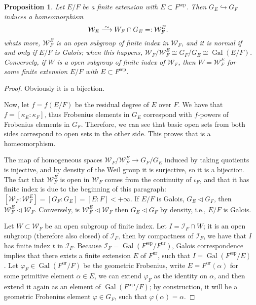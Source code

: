 \documentclass[12pt]{article}
\theoremstyle{plain}
\newtheorem{proposition}[theorem]{Proposition}
\theoremstyle{definition}
\newcommand{\isomlongrightarrow}{\mathrel{\stackon[1pt]{$\longrightarrow$}{\resizebox{!}{3pt}{$\sim$}}}}
\newcommand{\Gal}[2]{\operatorname{Gal} ( #1 / #2 )}
\newcommand{\sep}[1]{{#1}^{\operatorname{sep}}}
\newcommand{\ur}[1]{{#1}^{\operatorname{ur}}}
\newcommand{\inercia}[1]{\mathcal I_{#1}}
\newcommand{\weil}[1]{\mathcal W_{#1}}
\begin{document}
\begin{proposition}
Let $E/F$ be a finite extension with $E \subset \sep F$. Then $G_E \hookrightarrow G_F$ induces a homeomorphism
\[
    \weil E \isomlongrightarrow W_F \cap G_E =: \weil F^E.
\]
whats more, $\weil F^E$ is an open subgroup of finite index in $\weil F$, and it is normal if and only if $E/F$ is Galois; when this happens, $\weil F / \weil F^E \cong G_F / G_E \cong \Gal E F$. Conversely, if $W$ is a open subgroup of finite index of $\weil F$, then $W = \weil F^E$ for some finite extension $E/F$ with $E \subset \sep F$.
\end{proposition}
\begin{proof}
Obviously it is a bijection.

Now, let $f = f(E/F)$ be the residual degree of $E$ over $F$. We have that $f = [\kappa_E : \kappa_F]$, thus Frobenius elements in $G_E$ correspond with $f$-powers of Frobenius elements in $G_F$. Therefore, we can see that basic open sets from both sides correspond to open sets in the other side. This proves that is a homeomorphism.

The map of homogeneous spaces $\weil F / \weil F^E \to G_F / G_E$ induced by taking quotients is injective, and by density of the Weil group it is surjective, so it is a bijection. The fact that $\weil F^E$ is open in $\weil F$ comes from the continuity of $\iota_F$, and that it has finite index is due to the beginning of this paragraph: $[\weil F : \weil F^E] = [G_F : G_E] = [E : F] < +\infty$. If $E/F$ is Galois, $G_E \triangleleft G_F$, then $\weil F ^E \triangleleft \weil F$. Conversely, is $\weil F^E \triangleleft \weil F$ then $G_E \triangleleft G_F$ by density, i.e., $E/F$ is Galois.

\bigskip

Let $W \subset \weil F$ be an open subgroup of finite index. Let $I = \inercia F \cap W$; it is an open subgroup (therefore also closed) of $\inercia F$, then by compactness of $\inercia F$, we have that $I$ has finite index $t$ in $\inercia F$. Because $\inercia F = \Gal {\sep F} {\ur F}$, Galois correspondence implies that there exists a finite extension $E$ of $\ur F$, such that $I = \Gal {\sep F} {E}$. Let $\varphi_F \in \Gal {\ur F} F$ be the geometric Frobenius, write $E = \ur F (\alpha)$ for some primitive element $\alpha \in E$, we can extend $\varphi_F$ as the identity on $\alpha$, and then extend it again as an element of $\Gal {\sep F} F$; by construction, it will be a geometric Frobenius element $\varphi \in G_F$, such that $\varphi (\alpha) = \alpha$.


\end{proof}
\end{document}
